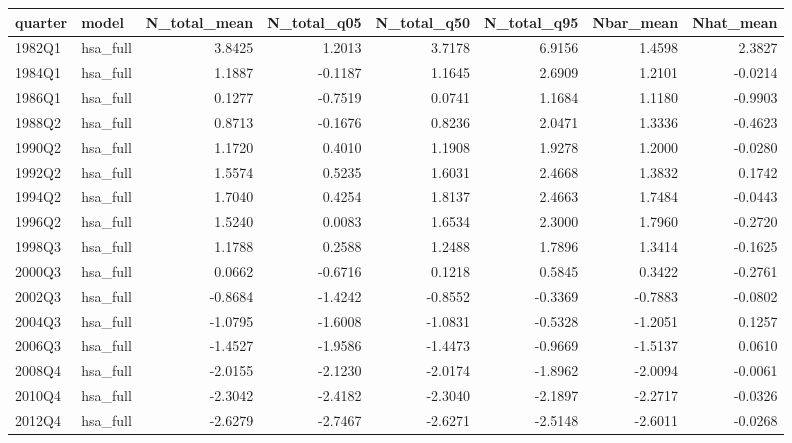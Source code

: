 \begin{tabular}{llrrrrrr}
\toprule
quarter & model & N\_total\_mean & N\_total\_q05 & N\_total\_q50 & N\_total\_q95 & Nbar\_mean & Nhat\_mean \\
\midrule
1982Q1 & hsa\_full & 3.8425 & 1.2013 & 3.7178 & 6.9156 & 1.4598 & 2.3827 \\
1984Q1 & hsa\_full & 1.1887 & -0.1187 & 1.1645 & 2.6909 & 1.2101 & -0.0214 \\
1986Q1 & hsa\_full & 0.1277 & -0.7519 & 0.0741 & 1.1684 & 1.1180 & -0.9903 \\
1988Q2 & hsa\_full & 0.8713 & -0.1676 & 0.8236 & 2.0471 & 1.3336 & -0.4623 \\
1990Q2 & hsa\_full & 1.1720 & 0.4010 & 1.1908 & 1.9278 & 1.2000 & -0.0280 \\
1992Q2 & hsa\_full & 1.5574 & 0.5235 & 1.6031 & 2.4668 & 1.3832 & 0.1742 \\
1994Q2 & hsa\_full & 1.7040 & 0.4254 & 1.8137 & 2.4663 & 1.7484 & -0.0443 \\
1996Q2 & hsa\_full & 1.5240 & 0.0083 & 1.6534 & 2.3000 & 1.7960 & -0.2720 \\
1998Q3 & hsa\_full & 1.1788 & 0.2588 & 1.2488 & 1.7896 & 1.3414 & -0.1625 \\
2000Q3 & hsa\_full & 0.0662 & -0.6716 & 0.1218 & 0.5845 & 0.3422 & -0.2761 \\
2002Q3 & hsa\_full & -0.8684 & -1.4242 & -0.8552 & -0.3369 & -0.7883 & -0.0802 \\
2004Q3 & hsa\_full & -1.0795 & -1.6008 & -1.0831 & -0.5328 & -1.2051 & 0.1257 \\
2006Q3 & hsa\_full & -1.4527 & -1.9586 & -1.4473 & -0.9669 & -1.5137 & 0.0610 \\
2008Q4 & hsa\_full & -2.0155 & -2.1230 & -2.0174 & -1.8962 & -2.0094 & -0.0061 \\
2010Q4 & hsa\_full & -2.3042 & -2.4182 & -2.3040 & -2.1897 & -2.2717 & -0.0326 \\
2012Q4 & hsa\_full & -2.6279 & -2.7467 & -2.6271 & -2.5148 & -2.6011 & -0.0268 \\
\bottomrule
\end{tabular}
